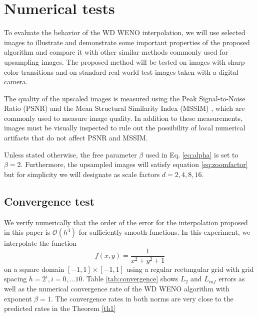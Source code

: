 \section{Numerical tests} 
	\label{sec:numtests}
	
To evaluate the behavior of the {WD} WENO interpolation, we will use selected images to illustrate and demonstrate some important properties of the proposed algorithm and compare it with other similar methods commonly used for upsampling images.
The proposed method will be tested on images with sharp color transitions and on standard real-world test images taken with a digital camera.

The quality of the upscaled images is measured using the Peak Signal-to-Noise Ratio (PSNR) \cite{Gonzales} and the Mean Structural Similarity Index (MSSIM) \cite{Wang}, which are commonly used to measure image quality.
In addition to these measurements, images must be visually inspected to rule out the possibility of local numerical artifacts that do not affect PSNR and MSSIM.

Unless stated otherwise, the free parameter $\beta$ used in Eq. \eqref{eq:alpha} is set to $\beta = 2$. Furthermore, the upsampled images will satisfy equation \eqref{eq:zoomfactor} but for simplicity we will designate as scale factors $d=2,4,8,16$.
	
\subsection{Convergence test}
We verify numerically that the order of the error for the interpolation proposed in this paper is $\mathcal{O}(h^4)$ for sufficiently smooth functions. In this experiment, we interpolate the function
$$f(x,y)=\frac{1}{x^2+y^2+1}$$
on a square domain $[-1,1] \times [-1,1]$ using a regular rectangular grid with grid spacing $h=2^i, i=0,\ldots10$. Table \ref{tab:convergence} shows $L_2$ and $L_{inf}$ errors as well as the numerical convergence rate of the {WD} WENO algorithm with exponent $\beta=1$. The convergence rates in both norms are very close to the predicted rates in the Theorem \ref{th1}
	
